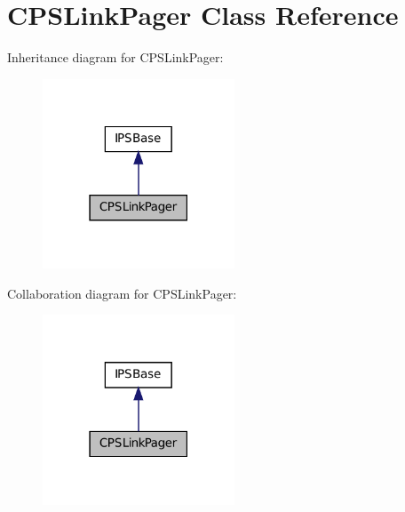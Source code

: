 \hypertarget{classCPSLinkPager}{
\section{CPSLinkPager Class Reference}
\label{classCPSLinkPager}
}


Inheritance diagram for CPSLinkPager:\nopagebreak
\begin{figure}[H]
\begin{center}
\leavevmode
\includegraphics[width=162pt]{classCPSLinkPager__inherit__graph}
\end{center}
\end{figure}


Collaboration diagram for CPSLinkPager:\nopagebreak
\begin{figure}[H]
\begin{center}
\leavevmode
\includegraphics[width=162pt]{classCPSLinkPager__coll__graph}
\end{center}
\end{figure}
